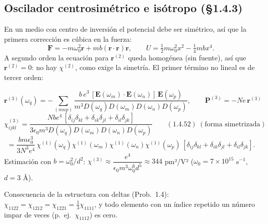 \documentclass[10pt]{article}
\begin{document}
\subsection{Oscilador centrosimétrico e isótropo (§1.4.3)}
En un medio con centro de inversión el potencial debe ser simétrico, así que la primera corrección es cúbica en la fuerza:
\[
\mathbf F=-m\omega_0^2\mathbf r+mb(\mathbf r\cdot\mathbf r)\mathbf r,\qquad U=\tfrac12m\omega_0^2x^2-\tfrac14mbx^4 .
\]
A segundo orden la ecuación para $\mathbf r^{(2)}$ queda homogénea (sin fuente), así que $\mathbf r^{(2)}=0$: no hay $\chi^{(2)}$, como exige la simetría. El primer término no lineal es de tercer orden:
\begin{clave}[title={$\chi^{(3)}$ del oscilador centrosimétrico}]
\[
\mathbf r^{(3)}(\omega_q)=-\sum_{(mnp)}\frac{b\,e^3\,[\mathbf E(\omega_m)\cdot\mathbf E(\omega_n)]\,\mathbf E(\omega_p)}{m^3D(\omega_q)D(\omega_m)D(\omega_n)D(\omega_p)},\qquad \mathbf P^{(3)}=-Ne\,\mathbf r^{(3)}
\]
\[
\chi^{(3)}_{ijkl}=\frac{Nbe^4\,[\delta_{ij}\delta_{kl}+\delta_{ik}\delta_{jl}+\delta_{il}\delta_{jk}]}{3\epsilon_0m^3D(\omega_q)D(\omega_m)D(\omega_n)D(\omega_p)}\qquad(1.4.52)\ (\text{forma simetrizada})
\]
\[
=\frac{bm\epsilon_0^3}{3N^3e^4}\,\chi^{(1)}(\omega_q)\chi^{(1)}(\omega_m)\chi^{(1)}(\omega_n)\chi^{(1)}(\omega_p)\,[\delta_{ij}\delta_{kl}+\delta_{ik}\delta_{jl}+\delta_{il}\delta_{jk}].
\]
Estimación con $b=\omega_0^2/d^2$: $\chi^{(3)}\approx\dfrac{e^4}{\epsilon_0m^3\omega_0^6d^5}\approx344$ pm²/V² ($\omega_0=7\times10^{15}$ s$^{-1}$, $d=3$ Å).
\end{clave}
Consecuencia de la estructura con deltas (Prob.~1.4): $\chi_{1122}=\chi_{1212}=\chi_{1221}=\frac13\chi_{1111}$, y todo elemento con un índice repetido un número impar de veces (p.~ej.\ $\chi_{1112}$) es cero.
\end{document}

